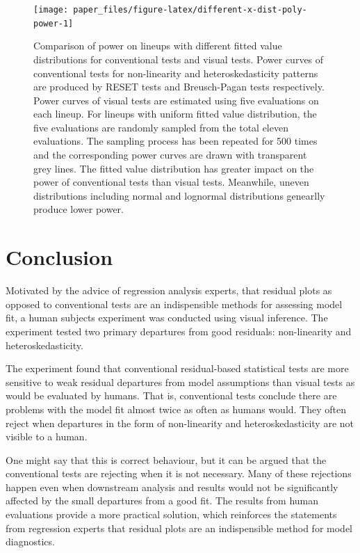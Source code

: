 \documentclass[]{interact}
\theoremstyle{plain}%
\theoremstyle{definition}
\theoremstyle{remark}
\begin{document}
\begin{figure}

{\centering \texttt{[image: paper\_files/figure-latex/different-x-dist-poly-power-1]} 

}

\caption{Comparison of power on lineups with different fitted value distributions for conventional tests and visual tests. Power curves of conventional tests for non-linearity and heteroskedasticity patterns are produced by RESET tests and Breusch-Pagan tests respectively. Power curves of visual tests are estimated using five evaluations on each lineup. For lineups with uniform fitted value distribution, the five evaluations are randomly sampled from the total eleven evaluations. The sampling process has been repeated for 500 times and the corresponding power curves are drawn with transparent grey lines. The fitted value distribution has greater impact on the power of conventional tests than visual tests. Meanwhile, uneven distributions including normal and lognormal distributions genearlly produce lower power.}\label{fig:different-x-dist-poly-power}
\end{figure}

\hypertarget{conclusion}{%
\section{Conclusion}\label{conclusion}}

Motivated by the advice of regression analysis experts, that residual
plots as opposed to conventional tests are an indispensible methods for
assessing model fit, a human subjects experiment was conducted using
visual inference. The experiment tested two primary departures from good
residuals: non-linearity and heteroskedasticity.

The experiment found that conventional residual-based statistical tests
are more sensitive to weak residual departures from model assumptions
than visual tests as would be evaluated by humans. That is, conventional
tests conclude there are problems with the model fit almost twice as
often as humans would. They often reject when departures in the form of
non-linearity and heteroskedasticity are not visible to a human.

One might say that this is correct behaviour, but it can be argued that
the conventional tests are rejecting when it is not necessary. Many of
these rejections happen even when downstream analysis and results would
not be significantly affected by the small departures from a good fit.
The results from human evaluations provide a more practical solution,
which reinforces the statements from regression experts that residual
plots are an indispensible method for model diagnostics.
\end{document}
